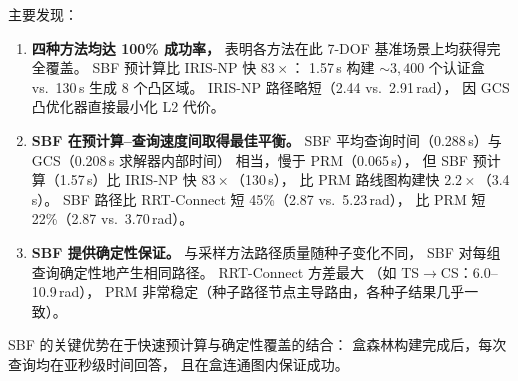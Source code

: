 \documentclass[journal]{IEEEtran}
\begin{document}
\begin{table}[ht]
\centering
\caption{基线对比（IIWA14 综合场景，5 查询对 $\times$ 5 种子，中位数）}
\label{tab:baselines}
\end{table}

主要发现：
\begin{enumerate}[nosep]
  \item \textbf{四种方法均达 100\% 成功率，}
    表明各方法在此 7-DOF 基准场景上均获得完全覆盖。
    SBF 预计算比 IRIS-NP 快 $83{\times}$：
    1.57\,s 构建 ${\sim}3{,}400$ 个认证盒 vs.\ 130\,s 生成 8 个凸区域。
    IRIS-NP 路径略短（2.44 vs.\ 2.91\,rad），
    因 GCS 凸优化器直接最小化 L2 代价。

  \item \textbf{SBF 在预计算--查询速度间取得最佳平衡。}
    SBF 平均查询时间（0.288\,s）与 GCS（0.208\,s 求解器内部时间）
    相当，慢于 PRM（0.065\,s），
    但 SBF 预计算（1.57\,s）比 IRIS-NP 快 $83{\times}$（130\,s），
    比 PRM 路线图构建快 $2.2{\times}$（3.4\,s）。
    SBF 路径比 RRT-Connect 短 45\%（2.87 vs.\ 5.23\,rad），
    比 PRM 短 22\%（2.87 vs.\ 3.70\,rad）。

  \item \textbf{SBF 提供确定性保证。}
    与采样方法路径质量随种子变化不同，
    SBF 对每组查询确定性地产生相同路径。
    RRT-Connect 方差最大
    （如 TS$\to$CS：6.0--10.9\,rad），
    PRM 非常稳定（种子路径节点主导路由，各种子结果几乎一致）。
\end{enumerate}

SBF 的关键优势在于快速预计算与确定性覆盖的结合：
盒森林构建完成后，每次查询均在亚秒级时间回答，
且在盒连通图内保证成功。
\end{document}
